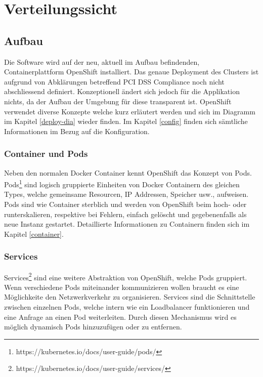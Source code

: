 \graphicspath{{./images/}}

\chapter{Verteilungssicht}
\label{deploy}

\section{Aufbau}
Die Software wird auf der neu, aktuell im Aufbau befindenden, Containerplattform OpenShift installiert. Das genaue Deployment des Clusters ist aufgrund von Abklärungen betreffend PCI DSS Compliance noch nicht abschliessend definiert. Konzeptionell ändert sich jedoch für die Applikation nichts, da der Aufbau der Umgebung für diese transparent ist.
OpenShift verwendet diverse Konzepte welche kurz erläutert werden und sich im Diagramm im Kapitel \ref{deploy-dia} wieder finden. Im Kapitel \ref{config} finden sich sämtliche Informationen im Bezug auf die Konfiguration.

\subsection{Container und Pods}

Neben den normalen Docker Container kennt OpenShift das Konzept von Pods. Pods\footnote{https://kubernetes.io/docs/user-guide/pods/} sind logisch gruppierte Einheiten von Docker Containern des gleichen Types, welche gemeinsame Resourcen, IP Addressen, Speicher usw.,  aufweisen. Pods sind wie Container sterblich und werden von OpenShift beim hoch- oder runterskalieren, respektive bei Fehlern, einfach gelöscht und gegebenenfalls als neue Instanz gestartet. Detaillierte Informationen zu Containern finden sich im Kapitel \ref{container}.

\subsection{Services}

Services\footnote{https://kubernetes.io/docs/user-guide/services/} sind eine weitere Abstraktion von OpenShift, welche Pods gruppiert. Wenn verschiedene Pods miteinander kommunizieren wollen braucht es eine Möglichkeite den Netzwerkverkehr zu organisieren. Services sind die Schnittstelle zwischen einzelnen Pods, welche intern wie ein Loadbalancer funktionieren und eine Anfrage an einen Pod weiterleiten. Durch diesen Mechanismus wird es möglich dynamisch Pods hinzuzufügen oder zu entfernen.


